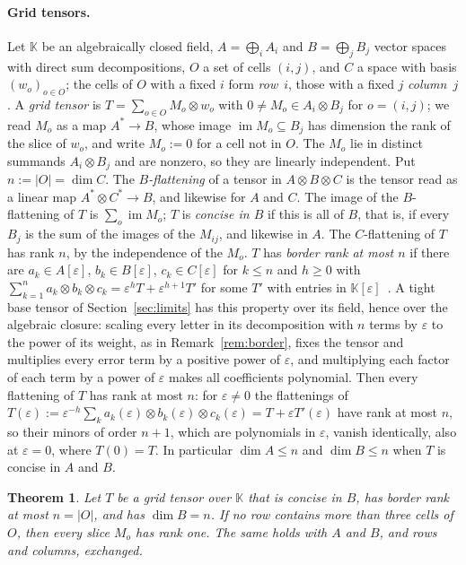 \documentclass[11pt]{article}
\newtheorem{theorem}{Theorem}[section]
\theoremstyle{definition}
\theoremstyle{remark}
\newcommand{\eps}{\varepsilon}
\begin{document}
\paragraph{Grid tensors.} Let $\mathbb K$ be an algebraically closed field, $A=\bigoplus_iA_i$ and $B=\bigoplus_jB_j$ vector spaces with direct sum decompositions, $O$ a set of cells $(i,j)$, and $C$ a space with basis $(w_o)_{o\in O}$; the cells of $O$ with a fixed $i$ form \emph{row}~$i$, those with a fixed $j$ \emph{column}~$j$. A \emph{grid tensor} is $T=\sum_{o\in O}M_o\otimes w_o$ with $0\ne M_o\in A_i\otimes B_j$ for $o=(i,j)$; we read $M_o$ as a map $A^*\to B$, whose image $\operatorname{im}M_o\subseteq B_j$ has dimension the rank of the slice of $w_o$, and write $M_o:=0$ for a cell not in $O$. The $M_o$ lie in distinct summands $A_i\otimes B_j$ and are nonzero, so they are linearly independent. Put $n:=|O|=\dim C$. The \emph{$B$-flattening} of a tensor in $A\otimes B\otimes C$ is the tensor read as a linear map $A^*\otimes C^*\to B$, and likewise for $A$ and $C$. The image of the $B$-flattening of $T$ is $\sum_o\operatorname{im}M_o$; $T$ is \emph{concise in $B$} if this is all of $B$, that is, if every $B_j$ is the sum of the images of the $M_{ij}$, and likewise in $A$. The $C$-flattening of $T$ has rank $n$, by the independence of the $M_o$. $T$ has \emph{border rank at most $n$} if there are $a_k\in A[\eps]$, $b_k\in B[\eps]$, $c_k\in C[\eps]$ for $k\le n$ and $h\ge0$ with $\sum_{k=1}^na_k\otimes b_k\otimes c_k=\eps^hT+\eps^{h+1}T'$ for some $T'$ with entries in $\mathbb K[\eps]$~\cite{Bin80}. A tight base tensor of Section~\ref{sec:limits} has this property over its field, hence over the algebraic closure: scaling every letter in its decomposition with $n$ terms by $\eps$ to the power of its weight, as in Remark~\ref{rem:border}, fixes the tensor and multiplies every error term by a positive power of $\eps$, and multiplying each factor of each term by a power of $\eps$ makes all coefficients polynomial. Then every flattening of $T$ has rank at most $n$: for $\eps\ne0$ the flattenings of $T(\eps):=\eps^{-h}\sum_ka_k(\eps)\otimes b_k(\eps)\otimes c_k(\eps)=T+\eps T'(\eps)$ have rank at most $n$, so their minors of order $n+1$, which are polynomials in $\eps$, vanish identically, also at $\eps=0$, where $T(0)=T$. In particular $\dim A\le n$ and $\dim B\le n$ when $T$ is concise in $A$ and $B$.

\begin{theorem}\label{thm:onecell}
Let $T$ be a grid tensor over $\mathbb K$ that is concise in $B$, has border rank at most $n=|O|$, and has $\dim B=n$. If no row contains more than three cells of $O$, then every slice $M_o$ has rank one. The same holds with $A$ and $B$, and rows and columns, exchanged.
\end{theorem}
\end{document}
